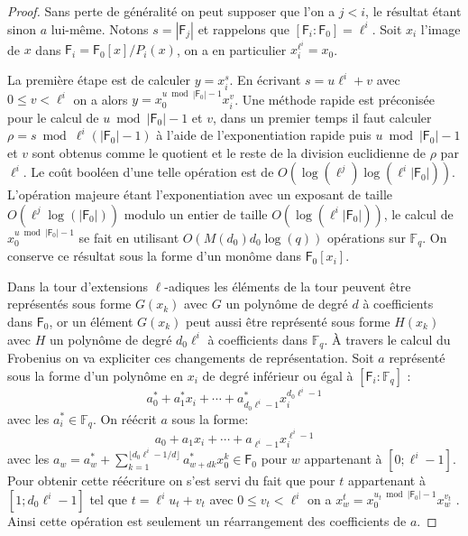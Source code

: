 \documentclass[10pt,a4paper]{book}
\theoremstyle{plain}
\theoremstyle{definition}
\theoremstyle{definition}
\theoremstyle{definition}
\theoremstyle{definition}
\theoremstyle{remark}
\theoremstyle{remark}
\theoremstyle{definition}
\begin{document}
\begin{proof}
Sans perte de généralité on peut supposer que l'on a $j<i$, le résultat étant sinon $a$ lui-même. Notons $s= |\mathsf{F}_j|$ et rappelons que $[\mathsf{F}_i:\mathsf{F}_0]=\ell^{i}$. Soit $x_i$ l'image de $x$ dans $\mathsf{F}_i=\mathsf{F}_0[x]/P_i(x)$, on a en particulier $x_i^{\ell^i}=x_0$.

La première étape est de calculer $y=x_i^s$. En écrivant $s=u\ell^i+v$ avec $0 \leqslant v < \ell^i$ on a alors $y=x_0^{u \bmod |\mathsf{F}_0|-1}x_i^v$. 
Une méthode rapide est préconisée pour le calcul de $u \bmod |\mathsf{F}_0|-1$ et $v$, dans un premier temps il faut calculer $\rho=s \bmod \ell^i(|\mathsf{F}_0|-1)$ à l'aide de l'exponentiation rapide puis $u \bmod |\mathsf{F}_0|-1$ et $v$ sont obtenus comme le quotient et le reste de la division euclidienne   de $\rho$ par $\ell^i$. Le coût booléen d'une telle opération est de $O(\log(\ell^j)\log(\ell^{i}|\mathsf{F}_0|))$. L'opération majeure étant l'exponentiation avec un exposant de taille $O(\ell^{j}\log(|\mathsf{F}_0|))$ modulo un entier de taille $O(\log(\ell^{i}|\mathsf{F}_0|))$, le calcul de $x_0^{u \bmod |\mathsf{F}_0|-1}$ se fait en utilisant $O( M(d_0) d_0\log(q))$ opérations sur $\mathbb{F}_q$. On conserve ce résultat sous la forme d'un monôme dans $\mathsf{F}_0[x_i]$. 

Dans la tour d'extensions $\ell$-adiques les éléments de la tour peuvent être représentés sous forme $G(x_k)$ avec $G$ un polynôme de degré $d$ à coefficients dans $\mathsf{F}_0$, or un élément $G(x_k)$ peut aussi être représenté sous forme $H(x_k)$ avec $H$ un polynôme de degré $d_0\ell^i$ à coefficients dans $\mathbb{F}_q$. \`A travers le calcul du Frobenius on va expliciter ces changements de représentation. Soit $a$ représenté sous la forme d'un polynôme en $x_i$ de degré inférieur ou égal à $[\mathsf{F}_i:\mathbb{F}_q]$ : 
\begin{equation*}
a^*_0+a_1^*x_i+ \cdots + a^*_{d_0\ell^i-1}x_i^{d_0\ell^i-1}
\end{equation*}
avec les $a_i^* \in \mathbb{F}_q$. On réécrit $a$ sous la forme:
\begin{equation*}
a_0+a_1x_i+ \cdots + a_{\ell^i-1}x_i^{\ell^i-1}
\end{equation*}
avec les $a_w=a_w^* + \sum_{k=1}^{\lfloor d_0\ell^i-1/d \rfloor}a_{w+dk}^*x_0^k \in \mathsf{F}_0$ pour $w$ appartenant à $[0; \ell^i-1]$. Pour obtenir cette réécriture on s'est servi du fait que pour $t$ appartenant à $[1; d_0\ell^i-1]$ tel que $t=\ell^i u_t+v_t$ avec $0 \leqslant v_t<\ell^i$ on a $x_w^t=x_0^{u_t \bmod |\mathsf{F}_0|-1}x_w^{v_t}$ . Ainsi cette opération est seulement un réarrangement des coefficients de $a$.


\end{proof}
\end{document}
